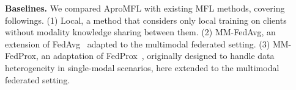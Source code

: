 \noindent\textbf{Baselines.}
We compared AproMFL with existing MFL methods, covering followings. 
(1) Local, a method that considers only local training on clients without modality knowledge sharing between them.
(2) MM-FedAvg, an extension of FedAvg~\cite{mcmahan2017communication} adapted to the multimodal federated setting. 
(3) MM-FedProx, an adaptation of FedProx~\cite{li2020federated}, originally designed to handle data heterogeneity in single-modal scenarios, here extended to the multimodal federated setting.





